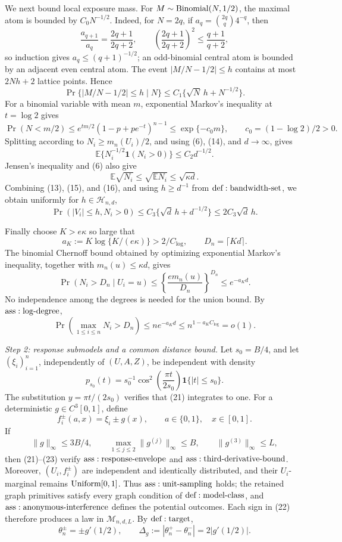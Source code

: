 We next bound local exposure mass.  For \(M\sim{\rm Binomial}(N,1/2)\), the maximal atom is bounded by \(C_0N^{-1/2}\).  Indeed, for \(N=2q\), if \(a_q={2q\choose q}4^{-q}\), then
\[
 \frac{a_{q+1}}{a_q}=\frac{2q+1}{2q+2},
 \qquad
 \left(\frac{2q+1}{2q+2}\right)^2\leq\frac{q+1}{q+2},
\tag{12}
\]
so induction gives \(a_q\leq(q+1)^{-1/2}\); an odd-binomial central atom is bounded by an adjacent even central atom.  The event \(|M/N-1/2|\leq h\) contains at most \(2Nh+2\) lattice points.  Hence
\[
 \Pr\{|M/N-1/2|\leq h\mid N\}
 \leq C_1\{\sqrt N\,h+N^{-1/2}\}.
\tag{13}
\]
For a binomial variable with mean \(m\), exponential Markov's inequality at \(t=\log2\) gives
\[
 \Pr(N<m/2)
 \leq e^{tm/2}(1-p+pe^{-t})^{n-1}
 \leq\exp\{-c_0m\},
 \qquad c_0=(1-\log2)/2>0.
\tag{14}
\]
Splitting according to \(N_i\geq m_n(U_i)/2\), and using (6), (14), and \(d\to\infty\), gives
\[
 \mathbb E\{N_i^{-1/2}\mathbf1(N_i>0)\}
 \leq C_2d^{-1/2}.
\tag{15}
\]
Jensen's inequality and (6) also give
\[
 \mathbb E\sqrt{N_i}\leq\sqrt{\mathbb EN_i}\leq\sqrt{\kappa d}.
\tag{16}
\]
Combining (13), (15), and (16), and using \(h\geq d^{-1}\) from \({\rm def:bandwidth\text{-}set}\), we obtain uniformly for \(h\in\mathcal H_{n,d}\),
\[
 \Pr(|V_i|\leq h,N_i>0)
 \leq C_3\{\sqrt d\,h+d^{-1/2}\}
 \leq2C_3\sqrt d\,h.
\tag{17}
\]

Finally choose \(K>e\kappa\) so large that
\[
 a_K:=K\log\{K/(e\kappa)\}>2/C_{\log},
 \qquad D_n=\lceil Kd\rceil.
\tag{18}
\]
The binomial Chernoff bound obtained by optimizing exponential Markov's inequality, together with \(m_n(u)\leq\kappa d\), gives
\[
 \Pr(N_i>D_n\mid U_i=u)
 \leq\left\{\frac{e m_n(u)}{D_n}\right\}^{D_n}
 \leq e^{-a_Kd}.
\tag{19}
\]
No independence among the degrees is needed for the union bound.  By \({\rm ass:log\text{-}degree}\),
\[
 \Pr\left(\max_{1\leq i\leq n}N_i>D_n\right)
 \leq ne^{-a_Kd}
 \leq n^{1-a_KC_{\log}}=o(1).
\tag{20}
\]

\textit{Step 2: response submodels and a common distance bound.}
Let \(s_0=B/4\), and let \((\xi_i)_{i=1}^n\), independently of \((U,A,Z)\), be independent with density
\[
 p_{s_0}(t)=s_0^{-1}\cos^2\!\left(\frac{\pi t}{2s_0}\right)
 \mathbf1\{|t|\leq s_0\}.
\tag{21}
\]
The substitution \(y=\pi t/(2s_0)\) verifies that (21) integrates to one.  For a deterministic \(g\in C^3[0,1]\), define
\[
 f_i^\pm(a,x)=\xi_i\pm g(x),
 \qquad a\in\{0,1\},\quad x\in[0,1].
\tag{22}
\]
If
\[
 \|g\|_\infty\leq3B/4,
 \qquad
 \max_{1\leq j\leq2}\|g^{(j)}\|_\infty\leq B,
 \qquad
 \|g^{(3)}\|_\infty\leq L,
\tag{23}
\]
then (21)--(23) verify \({\rm ass:response\text{-}envelope}\) and \({\rm ass:third\text{-}derivative\text{-}bound}\).  Moreover, \((U_i,f_i^\pm)\) are independent and identically distributed, and their \(U_i\)-marginal remains \({\rm Uniform}[0,1]\).  Thus \({\rm ass:unit\text{-}sampling}\) holds; the retained graph primitives satisfy every graph condition of \({\rm def:model\text{-}class}\), and \({\rm ass:anonymous\text{-}interference}\) defines the potential outcomes.  Each sign in (22) therefore produces a law in \(\mathcal M_{n,d,L}\).  By \({\rm def:target}\),
\[
 \theta_n^\pm=\pm g'(1/2),
 \qquad
 \Delta_g:=|\theta_n^+-\theta_n^-|=2|g'(1/2)|.
\tag{24}
\]

